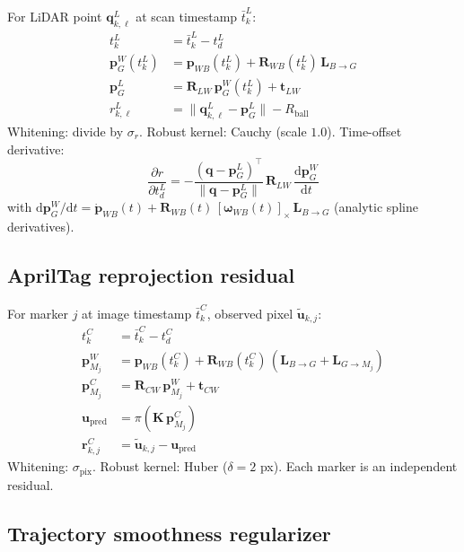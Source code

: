 For LiDAR point $\mathbf{q}_{k,\ell}^L$ at scan timestamp $\bar{t}_k^L$:
\begin{align}
  t_k^L &= \bar{t}_k^L - t_d^L \\
  \mathbf{p}_G^W(t_k^L) &= \mathbf{p}_{WB}(t_k^L) + \mathbf{R}_{WB}(t_k^L)\,\mathbf{L}_{B\to G} \\
  \mathbf{p}_G^L &= \mathbf{R}_{LW}\,\mathbf{p}_G^W(t_k^L) + \mathbf{t}_{LW} \\
  r_{k,\ell}^L &= \|\mathbf{q}_{k,\ell}^L - \mathbf{p}_G^L\| - R_{\mathrm{ball}}
\end{align}
Whitening: divide by $\sigma_r$. Robust kernel: Cauchy (scale $1.0$).
Time-offset derivative:
\begin{equation}
  \frac{\partial r}{\partial t_d^L} = -\frac{(\mathbf{q}-\mathbf{p}_G^L)^\top}{\|\mathbf{q}-\mathbf{p}_G^L\|}\,\mathbf{R}_{LW}\,\frac{\mathrm{d}\mathbf{p}_G^W}{\mathrm{d}t}
\end{equation}
with $\mathrm{d}\mathbf{p}_G^W/\mathrm{d}t = \dot{\mathbf{p}}_{WB}(t) + \mathbf{R}_{WB}(t)\,[\boldsymbol{\omega}_{WB}(t)]_\times\,\mathbf{L}_{B\to G}$ (analytic spline derivatives).

\subsection{AprilTag reprojection residual}
\label{sec:apriltag}

For marker $j$ at image timestamp $\bar{t}_k^C$, observed pixel $\tilde{\mathbf{u}}_{k,j}$:
\begin{align}
  t_k^C &= \bar{t}_k^C - t_d^C \\
  \mathbf{p}_{M_j}^W &= \mathbf{p}_{WB}(t_k^C) + \mathbf{R}_{WB}(t_k^C)\,(\mathbf{L}_{B\to G}+\mathbf{L}_{G\to M_j}) \\
  \mathbf{p}_{M_j}^C &= \mathbf{R}_{CW}\,\mathbf{p}_{M_j}^W + \mathbf{t}_{CW} \\
  \mathbf{u}_{\mathrm{pred}} &= \pi(\mathbf{K}\,\mathbf{p}_{M_j}^C) \\
  \mathbf{r}_{k,j}^C &= \tilde{\mathbf{u}}_{k,j} - \mathbf{u}_{\mathrm{pred}}
\end{align}
Whitening: $\sigma_{\mathrm{pix}}$. Robust kernel: Huber ($\delta=2$ px). Each marker is an independent residual.

\subsection{Trajectory smoothness regularizer}
\label{sec:smooth}

